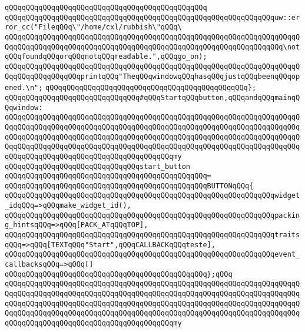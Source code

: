 \verb|qQQqqQQqqQQqqQQqqQQqqQQqqQQqqQQqqQQqqQQqqQQqqQQq|\newline
\verb|qQQqqQQqqQQqqQQqqQQqqQQqqQQqqQQqqQQqqQQqqQQqqQQqqQQqqQQqqQQqqQQquw::error_cc("FileqQQq\"/home/cxl/rubbish\"qQQq\|\newline
\verb|qQQqqQQqqQQqqQQqqQQqqQQqqQQqqQQqqQQqqQQqqQQqqQQqqQQqqQQqqQQqqQQqqQQqqQQqqQQqqQQqqQQqqQQqqQQqqQQqqQQqqQQqqQQqqQQqqQQqqQQqqQQqqQQqqQQqqQQq\notqQQqfoundqQQqorqQQqnotqQQqreadable.",qQQqgo_on);|\newline
\verb|qQQqqQQqqQQqqQQqqQQqqQQqqQQqqQQqqQQqqQQqqQQqqQQqqQQqqQQqqQQqqQQqqQQqqQQqqQQqqQQqqQQqqQQqprintqQQq"TheqQQqwindowqQQqhasqQQqjustqQQqbeenqQQqopened.\n";|\newline
\verb|qQQqqQQqqQQqqQQqqQQqqQQqqQQqqQQqqQQqqQQqqQQqqQQq};|\newline
\newline
\verb|qQQqqQQqqQQqqQQqqQQqqQQqqQQqqQQq#qQQqStartqQQqbutton,qQQqandqQQqmainqQQqwindow:|\newline
\verb|qQQqqQQqqQQqqQQqqQQqqQQqqQQqqQQqqQQqqQQqqQQqqQQqqQQqqQQqqQQqqQQqqQQqqQQqqQQqqQQqqQQqqQQqqQQqqQQqqQQqqQQqqQQqqQQqqQQqqQQqqQQqqQQqqQQqqQQqqQQqqQQqqQQqqQQqqQQqqQQqqQQqqQQqqQQqqQQqqQQqqQQqqQQqqQQqqQQqqQQqqQQqqQQqqQQqqQQqqQQqqQQqqQQqqQQqqQQqqQQqqQQqqQQqqQQqqQQqqQQqqQQqqQQqqQQqqQQqqQQqqQQqqQQqqQQqqQQqqQQqqQQqqQQqqQQqqQQqqQQqmy|\newline
\verb|qQQqqQQqqQQqqQQqqQQqqQQqqQQqqQQqstart_button|\newline
\verb|qQQqqQQqqQQqqQQqqQQqqQQqqQQqqQQqqQQqqQQqqQQqqQQq=|\newline
\verb|qQQqqQQqqQQqqQQqqQQqqQQqqQQqqQQqqQQqqQQqqQQqqQQqBUTTONqQQq{|\newline
\verb|qQQqqQQqqQQqqQQqqQQqqQQqqQQqqQQqqQQqqQQqqQQqqQQqqQQqqQQqqQQqqQQqwidget_idqQQq=>qQQqmake_widget_id(),|\newline
\verb|qQQqqQQqqQQqqQQqqQQqqQQqqQQqqQQqqQQqqQQqqQQqqQQqqQQqqQQqqQQqqQQqpacking_hintsqQQq=>qQQq[PACK_ATqQQqTOP],|\newline
\verb|qQQqqQQqqQQqqQQqqQQqqQQqqQQqqQQqqQQqqQQqqQQqqQQqqQQqqQQqqQQqqQQqtraitsqQQq=>qQQq[TEXTqQQq"Start",qQQqCALLBACKqQQqteste],|\newline
\verb|qQQqqQQqqQQqqQQqqQQqqQQqqQQqqQQqqQQqqQQqqQQqqQQqqQQqqQQqqQQqqQQqevent_callbacksqQQq=>qQQq[]|\newline
\verb|qQQqqQQqqQQqqQQqqQQqqQQqqQQqqQQqqQQqqQQqqQQqqQQq};qQQq|\newline
\verb|qQQqqQQqqQQqqQQqqQQqqQQqqQQqqQQqqQQqqQQqqQQqqQQqqQQqqQQqqQQqqQQqqQQqqQQqqQQqqQQqqQQqqQQqqQQqqQQqqQQqqQQqqQQqqQQqqQQqqQQqqQQqqQQqqQQqqQQqqQQqqQQqqQQqqQQqqQQqqQQqqQQqqQQqqQQqqQQqqQQqqQQqqQQqqQQqqQQqqQQqqQQqqQQqqQQqqQQqqQQqqQQqqQQqqQQqqQQqqQQqqQQqqQQqqQQqqQQqqQQqqQQqqQQqqQQqqQQqqQQqqQQqqQQqqQQqqQQqqQQqqQQqqQQqqQQqqQQqqQQqmy|\newline
